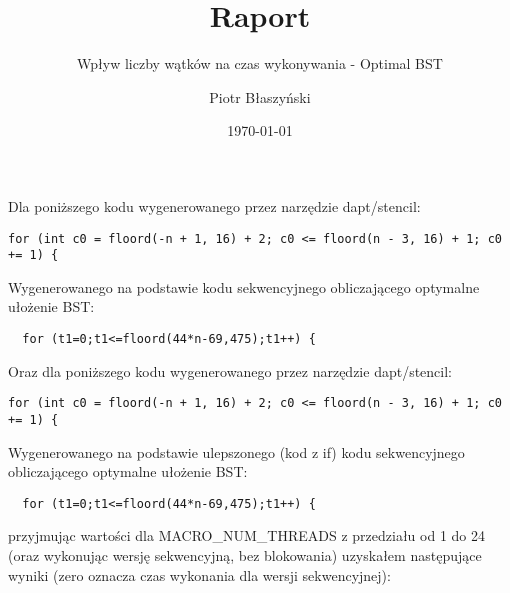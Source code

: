 \documentclass[a4paper,12pt]{scrartcl}
\title{Raport}
\subtitle{Wpływ liczby wątków na czas wykonywania - Optimal BST}
\author{Piotr Błaszyński}
\date{\today}
\begin{document}
\maketitle
{}

Dla poniższego kodu wygenerowanego przez narzędzie dapt/stencil:
\begin{lstlisting}
for (int c0 = floord(-n + 1, 16) + 2; c0 <= floord(n - 3, 16) + 1; c0 += 1) {
\end{lstlisting}

Wygenerowanego na podstawie kodu sekwencyjnego obliczającego optymalne ułożenie BST:
\begin{lstlisting}
  for (t1=0;t1<=floord(44*n-69,475);t1++) {
\end{lstlisting}

Oraz dla poniższego kodu wygenerowanego przez narzędzie dapt/stencil:
\begin{lstlisting}
for (int c0 = floord(-n + 1, 16) + 2; c0 <= floord(n - 3, 16) + 1; c0 += 1) {
\end{lstlisting}

Wygenerowanego na podstawie ulepszonego (kod z if) kodu sekwencyjnego obliczającego optymalne ułożenie BST:
\begin{lstlisting}
  for (t1=0;t1<=floord(44*n-69,475);t1++) {
\end{lstlisting}


przyjmując wartości dla MACRO\_NUM\_THREADS z przedziału od 1 do 24 (oraz wykonując wersję sekwencyjną, bez blokowania) uzyskałem następujące wyniki (zero oznacza czas wykonania dla wersji sekwencyjnej):
\end{document}
